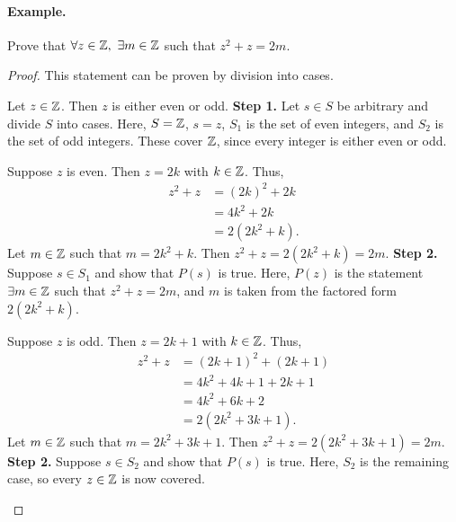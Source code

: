 \paragraph{Example.}
\begin{exercise}{
    Prove that $\forall z \in \Z,\ \exists m \in \Z$ such that %
    $z^2 + z = 2m$.
}
\end{exercise}
\begin{proof}{
    This statement can be proven by division into cases.

    \begin{annotatedpanel}[Setup.]{
        Let $z \in \mathbb{Z}$. %
        Then $z$ is either even or odd.
    }{
        \textbf{Step 1.} Let $s \in S$ be arbitrary and divide $S$ into %
        cases. %
        Here, $S = \mathbb{Z}$, $s = z$, $S_1$ is the set of even integers, %
        and $S_2$ is the set of odd integers. %
        These cover $\mathbb{Z}$, since every integer is either even or odd.
    }
    \end{annotatedpanel}

    \begin{annotatedpanel}[Case 1.]{
        Suppose $z$ is even. %
        Then $z = 2k$ with $k \in \mathbb{Z}$. %
        Thus, %
        \begin{align*}
            z^2 + z &= (2k)^2 + 2k\\
                    &= 4k^2 + 2k\\
                    &= 2(2k^2 + k).
        \end{align*}
        Let $m \in \mathbb{Z}$ such that $m = 2k^2 + k$. %
        Then $z^2 + z = 2(2k^2 + k) = 2m$.
    }{
        \textbf{Step 2.} Suppose $s \in S_1$ and show that $P(s)$ is true. %
        Here, $P(z)$ is the statement $\exists m \in \mathbb{Z}$ such that %
        \mbox{$z^2 + z = 2m$}, %
        and $m$ is taken from the factored form $2(2k^2 + k)$.
    }
    \end{annotatedpanel}

    \begin{annotatedpanel}[Case 2.]{
        Suppose $z$ is odd. %
        Then $z = 2k + 1$ with $k \in \mathbb{Z}$. %
        Thus, %
        \begin{align*}
            z^2 + z &= (2k + 1)^2 + (2k + 1)\\
                    &= 4k^2 + 4k + 1 + 2k + 1\\
                    &= 4k^2 + 6k + 2\\
                    &= 2(2k^2 + 3k + 1).
        \end{align*}
        Let $m \in \mathbb{Z}$ such that $m = 2k^2 + 3k + 1$. %
        Then $z^2 + z = 2(2k^2 + 3k + 1) = 2m$.
    }{
        \textbf{Step 2.} Suppose $s \in S_2$ and show that $P(s)$ is true. %
        Here, $S_2$ is the remaining case, so every $z \in \mathbb{Z}$ is now %
        covered.
    }
    \end{annotatedpanel}

}
\end{proof}
